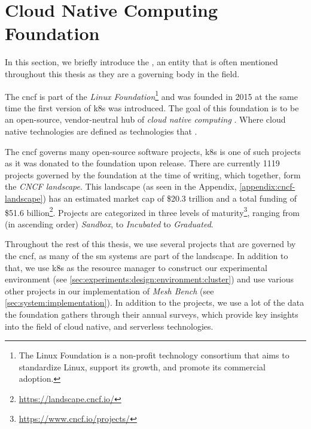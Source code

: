 \section{Cloud Native Computing Foundation}
\label{sec:background:cncf}


In this section, we briefly introduce the , an entity that is often mentioned throughout this thesis as they are a governing body in the field. 

The \gls{cncf} is part of the \textit{Linux Foundation}\footnote{The Linux Foundation  is a non-profit technology consortium that aims to standardize Linux, support its growth, and promote its commercial adoption.} and was founded in 2015 at the same time the first version of \gls{k8s} was introduced. The goal of this foundation is to be an open-source, vendor-neutral  hub of \textit{cloud native computing} \cite{cncf-charter}. Where cloud native technologies are defined as technologies that .

The \gls{cncf} governs many open-source software projects, \gls{k8s} is one of such projects as it was donated to the foundation upon release. There are currently 1119 projects governed by the foundation at the time of writing, which together, form the \textit{CNCF landscape}. This landscape (as seen in the Appendix, \cref{appendix:cncf-landscape}) has an estimated market cap of \$20.3 trillion and a total funding of \$51.6 billion\footnote{\url{https://landscape.cncf.io/}}. Projects are categorized in three levels of maturity\footnote{\url{https://www.cncf.io/projects/}}, ranging from (in ascending order) \textit{Sandbox}, to \textit{Incubated} to \textit{Graduated}.

Throughout the rest of this thesis, we use several projects that are governed by the \gls{cncf}, as many of the \gls{sm} systems are part of the landscape. In addition to that, we use \gls{k8s} as the resource manager to construct our experimental environment (see \cref{sec:experiments:design:environment:cluster}) and use various other projects in our implementation of \textit{Mesh Bench} (see \cref{sec:system:implementation}). In addition to the projects, we use a lot of the data the foundation gathers through their annual surveys, which provide key insights into the field of cloud native, and serverless technologies.
 